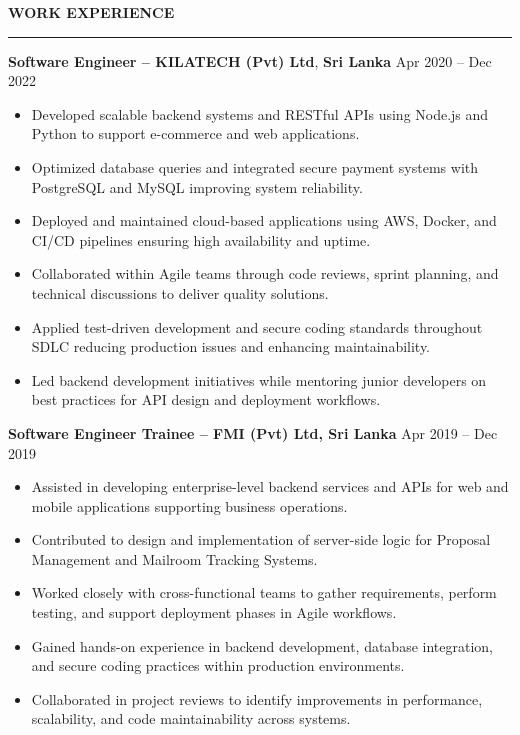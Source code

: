 \documentclass[10pt,letterpaper]{article}
\begin{document}
\vspace{8pt}

\textbf{WORK EXPERIENCE}\\[-8pt]
\noindent\rule{\textwidth}{1pt}

\vspace{-2pt}

\textbf{Software Engineer -- KILATECH (Pvt) Ltd}, \textbf{Sri Lanka} \hfill Apr 2020 -- Dec 2022

\vspace{-1pt}

\begin{itemize}
\item Developed scalable backend systems and RESTful APIs using Node.js and Python to support e-commerce and web applications.
\item Optimized database queries and integrated secure payment systems with PostgreSQL and MySQL improving system reliability.
\item Deployed and maintained cloud-based applications using AWS, Docker, and CI/CD pipelines ensuring high availability and uptime.
\item Collaborated within Agile teams through code reviews, sprint planning, and technical discussions to deliver quality solutions.
\item Applied test-driven development and secure coding standards throughout SDLC reducing production issues and enhancing maintainability.
\item Led backend development initiatives while mentoring junior developers on best practices for API design and deployment workflows.
\end{itemize}

\textbf{Software Engineer Trainee -- FMI (Pvt) Ltd, Sri Lanka} \hfill Apr 2019 -- Dec 2019

\vspace{-1pt}

\begin{itemize}
\item Assisted in developing enterprise-level backend services and APIs for web and mobile applications supporting business operations.
\item Contributed to design and implementation of server-side logic for Proposal Management and Mailroom Tracking Systems.
\item Worked closely with cross-functional teams to gather requirements, perform testing, and support deployment phases in Agile workflows.
\item Gained hands-on experience in backend development, database integration, and secure coding practices within production environments.
\item Collaborated in project reviews to identify improvements in performance, scalability, and code maintainability across systems.
\end{itemize}
\end{document}
